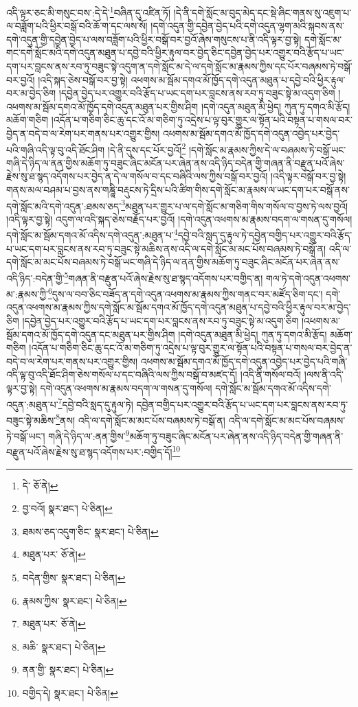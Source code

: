 འདི་ལྟར་ཅང་མི་གསུང་བས་:དེ་དེ་\footnote{དེ་  ཅོ་ནེ། }བཞིན་དུ་འཛིན་ཏོ། །དེ་ནི་དགེ་སློང་མ་བུད་མེད་དང་སྡེ་ཞིང་གནས་སུ་འཇུག་པ་ལ་བཟློག་པའི་ཕྱིར་བསྒོ་བའི་ཆོ་ག་དང་ལས་སོ། །དགེ་འདུན་གྱི་དབྱེན་བྱེད་པའི་དགེ་འདུན་ལྷག་མའི་སྐབས་ནས་དགེ་འདུན་གྱི་དབྱེན་བྱེད་པ་ལས་བཟློག་པའི་ཕྱིར་བསྒོ་བར་བྱའོ་ཞེས་གསུངས་པ་ནི་འདི་ལྟར་བྱ་སྟེ། དགེ་སློང་མ་གང་དགེ་སློང་མའི་དགེ་འདུན་མཐུན་པ་དབྱེ་བའི་ཕྱིར་རྟུལ་བར་བྱེད་ཅིང་དབྱེན་བྱེད་པར་འགྱུར་བའི་རྩོད་པ་ཡང་དག་པར་བླངས་ནས་རབ་ཏུ་བཟུང་སྟེ་འདུག་ན་དགེ་སློང་མ་དེ་ལ་དགེ་སློང་མ་རྣམས་ཀྱིས་དང་པོར་བཞམས་ཏེ་བསྒོ་བར་བྱའོ། །འདི་སྐད་ཅེས་བསྒོ་བར་བྱ་སྟེ། འཕགས་མ་སྦོམ་དགའ་མོ་ཁྱོད་དགེ་འདུན་མཐུན་པ་དབྱེ་བའི་ཕྱིར་རྟུལ་བར་མ་བྱེད་ཅིག །དབྱེན་བྱེད་པར་འགྱུར་བའི་རྩོད་པ་ཡང་དག་པར་བླངས་ནས་རབ་ཏུ་བཟུང་སྟེ་མ་འདུག་ཅིག །འཕགས་མ་སྦོམ་དགའ་མོ་ཁྱོད་དགེ་འདུན་མཐུན་པར་གྱིས་ཤིག །དགེ་འདུན་མཐུན་མི་ཕྱེད། ཀུན་ཏུ་དགའ་མི་རྩོད། མཆོག་གཅིག །འདོན་པ་གཅིག་ཅིང་ཆུ་དང་འོ་མ་གཅིག་ཏུ་འདྲེས་པ་ལྟ་བུར་གྱུར་ལ་སྟོན་པའི་བསྟན་པ་གསལ་བར་བྱེད་ན་བདེ་བ་ལ་རེག་པར་གནས་པར་འགྱུར་གྱིས། འཕགས་མ་སྦོམ་དགའ་མོ་ཁྱོད་དགེ་འདུན་འབྱེད་པར་བྱེད་པའི་གཞི་འདི་ལྟ་བུ་འདི་ཐོང་ཤིག །དེ་ནི་དུས་དང་པོར་བྱའོ།\footnote{བྱ་བའོ།  སྣར་ཐང་།  པེ་ཅིན། } །དགེ་སློང་མ་རྣམས་ཀྱིས་དེ་ལ་བཞམས་ཏེ་བསྒོ་ཡང་གཞི་དེ་ཉིད་ལ་ནན་གྱིས་མཆོག་ཏུ་བཟུང་ཞིང་མངོན་པར་ཞེན་ནས་འདི་ཉིད་བདེན་གྱི་གཞན་ནི་བརྫུན་པའོ་ཞེས་རྗེས་སུ་ཐ་སྙད་འདོགས་པར་བྱེད་ན་དེ་ལ་གསོལ་བ་དང་བཞིའི་ལས་ཀྱིས་བསྒོ་བར་བྱའོ། །འདི་ལྟར་བསྒོ་བར་བྱ་སྟེ། གནས་མལ་བཤམ་པ་བྱས་ནས་གཎྜཱི་བརྡུངས་ཏེ་དྲིས་པའི་ཚིག་གིས་དགེ་སློང་མ་རྣམས་ལ་ཡང་དག་པར་བསྒོ་ནས་དགེ་སློང་མའི་དགེ་འདུན་:ཐམས་ཅད་\footnote{ཐམས་ཅད་འདུག་ཅིང་  སྣར་ཐང་།  པེ་ཅིན། }མཐུན་པར་གྱུར་པ་ལ་དགེ་སློང་མ་གཅིག་གིས་གསོལ་བ་བྱས་ཏེ་ལས་བྱའོ། །འདི་ལྟར་བྱ་སྟེ། འདུག་ལ་འདི་སྐད་ཅེས་བརྗོད་པར་བྱའོ། །དགེ་འདུན་འཕགས་མ་རྣམས་བདག་ལ་གསན་དུ་གསོལ། དགེ་སློང་མ་སྦོམ་དགའ་མོ་འདིས་དགེ་འདུན་:མཐུན་པ་\footnote{མཐུན་པར་  ཅོ་ནེ། }དབྱེ་བའི་སླད་དུ་རྟུལ་ཏེ་དབྱེན་བགྱིད་པར་འགྱུར་བའི་རྩོད་པ་ཡང་དག་པར་བླངས་ནས་རབ་ཏུ་བཟུང་སྟེ་མཆིས་ནས་འདི་ལ་དགེ་སློང་མ་མང་པོས་བཞམས་ཏེ་བསྒོ་ན། འདི་ལ་དགེ་སློང་མ་མང་པོས་བཞམས་ཏེ་བསྒོ་ཡང་གཞི་དེ་ཉིད་ལ་ནན་གྱིས་མཆོག་ཏུ་བཟུང་ཞིང་མངོན་པར་ཞེན་ནས་འདི་ཉིད་:བདེན་གྱི་\footnote{བདེན་གྱིས་  སྣར་ཐང་།  པེ་ཅིན། }གཞན་ནི་བརྫུན་པའོ་ཞེས་རྗེས་སུ་ཐ་སྙད་འདོགས་པར་བགྱིད་ན། གལ་ཏེ་དགེ་འདུན་འཕགས་མ་:རྣམས་ཀྱི་\footnote{རྣམས་ཀྱིས་  སྣར་ཐང་།  པེ་ཅིན། }དུས་ལ་བབ་ཅིང་བཟོད་ན་དགེ་འདུན་འཕགས་མ་རྣམས་ཀྱིས་གནང་བར་མཛོད་ཅིག་དང་། དགེ་འདུན་འཕགས་མ་རྣམས་ཀྱིས་དགེ་སློང་མ་སྦོམ་དགའ་མོ་ཁྱོད་དགེ་འདུན་མཐུན་པ་དབྱེ་བའི་ཕྱིར་རྟུལ་བར་མ་བྱེད་ཅིག །དབྱེན་བྱེད་པར་འགྱུར་བའི་རྩོད་པ་ཡང་དག་པར་བླངས་ནས་རབ་ཏུ་བཟུང་སྟེ་མ་འདུག་ཅིག །འཕགས་མ་སྦོམ་དགའ་མོ་ཁྱོད་དགེ་འདུན་དང་མཐུན་པར་གྱིས་ཤིག །དགེ་འདུན་མཐུན་མི་ཕྱེད། ཀུན་ཏུ་དགའ་མི་རྩོད། མཆོག་གཅིག །འདོན་པ་གཅིག་ཅིང་ཆུ་དང་འོ་མ་གཅིག་ཏུ་འདྲེས་པ་ལྟ་བུར་གྱུར་ལ་སྟོན་པའི་བསྟན་པ་གསལ་བར་བྱེད་ན་བདེ་བ་ལ་རེག་པར་གནས་པར་འགྱུར་གྱིས། འཕགས་མ་སྦོམ་དགའ་མོ་ཁྱོད་དགེ་འདུན་འབྱེད་པར་བྱེད་པའི་གཞི་འདི་ལྟ་བུ་འདི་ཐོང་ཤིག་ཅེས་གསོལ་པ་དང་བཞིའི་ལས་ཀྱིས་བསྒོ་བ་མཛད་དོ། །འདི་ནི་གསོལ་བའོ། །ལས་ནི་འདི་ལྟར་བྱ་སྟེ། དགེ་འདུན་འཕགས་མ་རྣམས་བདག་ལ་གསན་དུ་གསོལ། དགེ་སློང་མ་སྦོམ་དགའ་མོ་འདིས་དགེ་འདུན་:མཐུན་པ་\footnote{མཐུན་པར་  ཅོ་ནེ། }དབྱེ་བའི་སླད་དུ་རྟུལ་ཏེ། དབྱེན་བགྱིད་པར་འགྱུར་བའི་རྩོད་པ་ཡང་དག་པར་བླངས་ནས་རབ་ཏུ་བཟུང་སྟེ་མཆིས་\footnote{མཆི་  སྣར་ཐང་།  པེ་ཅིན། }ནས། འདི་ལ་དགེ་སློང་མ་མང་པོས་བཞམས་ཏེ་བསྒོ་ན། འདི་ལ་དགེ་སློང་མ་མང་པོས་བཞམས་ཏེ་བསྒོ་ཡང་། གཞི་དེ་ཉིད་ལ་:ནན་གྱིས་\footnote{ནན་གྱི་  སྣར་ཐང་།  པེ་ཅིན། }མཆོག་ཏུ་བཟུང་ཞིང་མངོན་པར་ཞེན་ནས་འདི་ཉིད་བདེན་གྱི་གཞན་ནི་བརྫུན་པའོ་ཞེས་རྗེས་སུ་ཐ་སྙད་འདོགས་པར་:བགྱིད་དོ།\footnote{བགྱིད་དེ།  སྣར་ཐང་།  པེ་ཅིན། } 